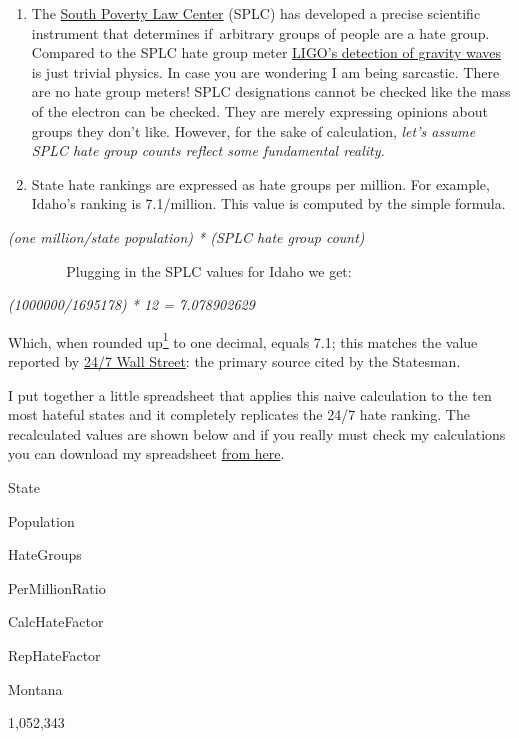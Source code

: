 \begin{enumerate}
\def\labelenumi{\arabic{enumi}.}
\tightlist
\item
  The \href{https://www.splcenter.org/}{South Poverty Law Center} (SPLC)
  has developed a precise scientific instrument that determines
  if~arbitrary groups of people are a hate group. Compared to the SPLC
  hate group meter \href{https://www.ligo.caltech.edu/}{LIGO's detection
  of gravity waves} is just trivial physics. In case you are wondering I
  am being sarcastic. There are no hate group meters! SPLC designations
  cannot be checked like the mass of the electron can be checked. They
  are merely expressing opinions about groups they don't like. However,
  for the sake of calculation, \emph{let's assume SPLC hate group counts
  reflect some fundamental reality.}
\item
  State hate rankings are expressed as hate groups per million. For
  example, Idaho's ranking is 7.1/million. This value is computed by the
  simple formula.
\end{enumerate}

\emph{(one million/state population) * (SPLC hate group count)}

~ ~ ~ ~ ~ Plugging in the SPLC values for Idaho we get:

\emph{(1000000/1695178) * 12 = 7.078902629}

Which, when rounded up\protect\hyperlink{fn1}{\textsuperscript{1}} to
one decimal, equals 7.1; this matches the value reported by
\href{http://247wallst.com/special-report/2017/08/14/10-states-with-the-most-hate-groups-3/4/}{24/7
Wall Street}: the primary source cited by the Statesman.

I put together a little spreadsheet that applies this naive calculation
to the ten most hateful states and it completely replicates the 24/7
hate ranking. The recalculated values are shown below and if you really
must check my calculations you can download my spreadsheet
\href{https://github.com/bakerjd99/Analyze-the-Data-not-the-Drivel/blob/5381f7a91b7614b0de1cc5343eb097e20653de64/wp2latex/inclusions/hfc.xlsx}{from
here}.

State

Population

HateGroups

PerMillionRatio

CalcHateFactor

RepHateFactor

Montana

1,052,343

